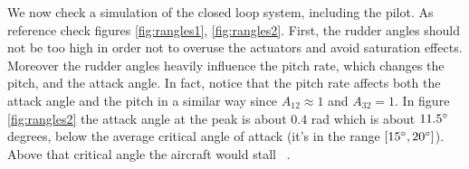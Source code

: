  We now check a simulation of the closed loop system, including the pilot. As reference check figures \ref{fig:rangles1}, \ref{fig:rangles2}. First, the rudder angles should not be too high in order not to overuse the actuators and avoid saturation effects. Moreover the rudder angles heavily influence the pitch rate, which changes the pitch, and the attack angle. In fact, notice that the pitch rate affects both the attack angle and the pitch in a similar way since $A_{12} \approx 1$ and $A_{32} = 1$. In figure \ref{fig:rangles2} the attack angle at the peak is about $0.4$ rad which is about $11.5 \degree$ degrees, below the average critical angle of attack (it's in the range $[15 \degree ,20 \degree]$). Above that critical angle the aircraft would stall ~\cite{Wikipedia:aoa}.
